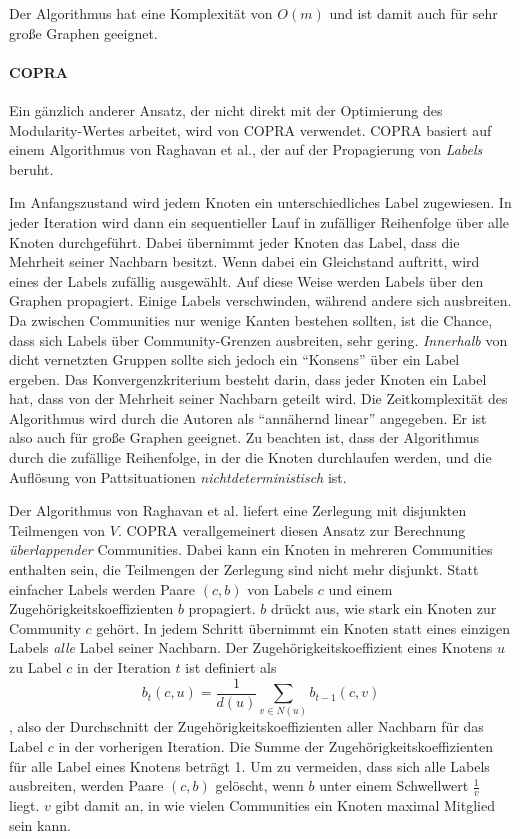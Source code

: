 Der Algorithmus hat eine Komplexität von $O(m)$ und ist damit auch
für sehr große Graphen geeignet.

\paragraph{COPRA}
\label{sec:copra}

Ein gänzlich anderer Ansatz, der nicht direkt mit der Optimierung
des Modularity-Wertes arbeitet, wird von COPRA\cite{Gregory2010}
verwendet. COPRA basiert auf einem Algorithmus von Raghavan et
al.\cite{Raghavan2007}, der auf der Propagierung von \emph{Labels}
beruht. 

Im Anfangszustand wird jedem Knoten ein unterschiedliches Label
zugewiesen. In jeder Iteration wird dann ein sequentieller Lauf in
zufälliger Reihenfolge über alle Knoten durchgeführt. Dabei
übernimmt jeder Knoten das Label, dass die Mehrheit seiner Nachbarn
besitzt. Wenn dabei ein Gleichstand auftritt, wird eines der Labels
zufällig ausgewählt. Auf diese Weise werden Labels über den
Graphen propagiert. Einige Labels verschwinden, während andere sich
ausbreiten. Da zwischen Communities nur wenige Kanten bestehen
sollten, ist die Chance, dass sich Labels über Community-Grenzen
ausbreiten, sehr gering. \emph{Innerhalb} von dicht vernetzten Gruppen
sollte sich jedoch ein ``Konsens'' über ein Label ergeben. Das
Konvergenzkriterium besteht darin, dass jeder Knoten ein Label hat,
dass von der Mehrheit seiner Nachbarn geteilt wird. Die
Zeitkomplexität des Algorithmus wird durch die Autoren als
``annähernd linear'' angegeben. Er ist also auch für große
Graphen geeignet. Zu beachten ist, dass der Algorithmus durch die
zufällige Reihenfolge, in der die Knoten durchlaufen werden, und die
Auflösung von Pattsituationen \emph{nichtdeterministisch} ist.

Der Algorithmus von Raghavan et al. liefert eine Zerlegung mit
disjunkten Teilmengen von $V$. COPRA verallgemeinert diesen Ansatz zur
Berechnung \emph{überlappender} Communities. Dabei kann ein Knoten
in mehreren Communities enthalten sein, die Teilmengen der Zerlegung
sind nicht mehr disjunkt. Statt einfacher Labels werden Paare $(c, b)$
von Labels $c$ und einem Zugehörigkeitskoeffizienten $b$
propagiert. $b$ drückt aus, wie stark ein Knoten zur Community $c$
gehört. In jedem Schritt übernimmt ein Knoten statt eines einzigen
Labels \emph{alle} Label seiner Nachbarn. Der
Zugehörigkeitskoeffizient eines Knotens $u$ zu Label $c$ in der
Iteration $t$ ist definiert als
\begin{equation}
  \label{eq:10}
  b_t(c, u) = \frac{1}{d(u)}\sum_{v \in N(u)}b_{t-1}(c, v)
\end{equation}
, also der Durchschnitt der Zugehörigkeitskoeffizienten aller
Nachbarn für das Label $c$ in der vorherigen Iteration. Die Summe
der Zugehörigkeitskoeffizienten für alle Label eines Knotens
beträgt 1. Um zu vermeiden, dass sich alle Labels ausbreiten, werden
Paare $(c, b)$ gelöscht, wenn $b$ unter einem Schwellwert
$\frac{1}{v}$ liegt. $v$ gibt damit an, in wie vielen Communities ein
Knoten maximal Mitglied sein kann. 

